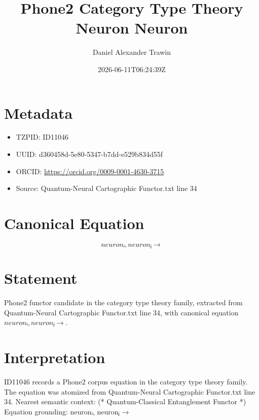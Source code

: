 \documentclass[11pt]{article}
\title{Phone2 Category Type Theory Neuron Neuron}
\author{Daniel Alexander Trawin}
\date{2026-06-11T06:24:39Z}
\begin{document}
\maketitle
\section*{Metadata}
\begin{itemize}
\item TZPID: ID11046
\item UUID: d360458d-5e80-5347-b7dd-e529b834d55f
\item ORCID: \url{https://orcid.org/0009-0001-4630-3715}
\item Source: Quantum-Neural Cartographic Functor.txt line 34
\end{itemize}
\section*{Canonical Equation}
\[
{neuronᵢ, neuronⱼ} →
\]
\section*{Statement}
Phone2 functor candidate in the category type theory family, extracted from Quantum-Neural Cartographic Functor.txt line 34, with canonical equation ${neuronᵢ, neuronⱼ} →$.
\section*{Interpretation}
ID11046 records a Phone2 corpus equation in the category type theory family. The equation was atomized from Quantum-Neural Cartographic Functor.txt line 34. Nearest semantic context: (* Quantum-Classical Entanglement Functor *) Equation grounding: {neuronᵢ, neuronⱼ} →
\end{document}
